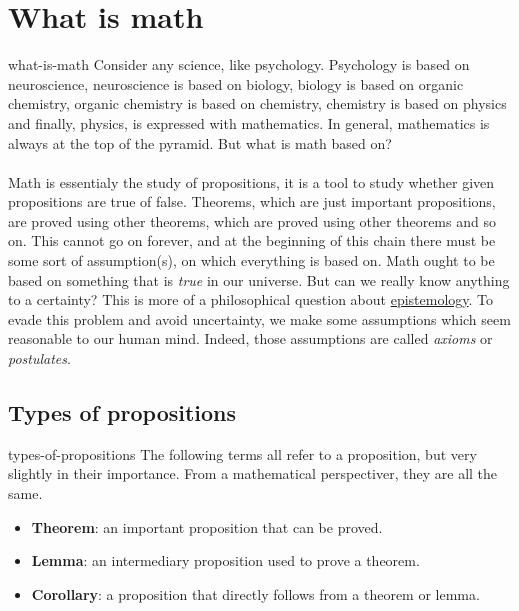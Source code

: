 \documentclass[preview]{standalone}
\begin{document}
\genpage

\section{What is math}

\begin{snippet}{what-is-math}
Consider any science, like psychology. Psychology is based on
neuroscience, neuroscience is based on biology,
biology is based on organic chemistry, organic chemistry is based on chemistry,
chemistry is based on physics and finally, physics, is expressed with mathematics.
In general, mathematics is always at the top of the pyramid.
But what is math based on?
\\\\
Math is essentialy the study of propositions,
it is a tool to study whether given propositions are true of false.
Theorems, which are just important propositions, are proved using other theorems,
which are proved using other theorems and so on. This cannot go on forever, and at the
beginning of this chain there must be some sort of assumption(s), on which everything
is based on.
Math ought to be based on something that is \textit{true} in our universe.
But can we really know anything to a certainty?
This is more of a philosophical question about \href{https://en.wikipedia.org/wiki/Epistemology}{epistemology}.
To evade this problem and avoid uncertainty, we make some assumptions which seem reasonable to our human mind.
Indeed, those assumptions are called \textit{axioms} or \textit{postulates}.
\end{snippet}


\subsection{Types of propositions}

\begin{snippet}{types-of-propositions}
The following terms all refer to a proposition, but very slightly in their importance.
From a mathematical perspectiver, they are all the same.
\\
\begin{itemize}
    \item \textbf{Theorem}: an important proposition that can be proved.
    \item \textbf{Lemma}: an intermediary proposition used to prove a theorem.
    \item \textbf{Corollary}: a proposition that directly follows from a theorem or lemma.
\end{itemize}
\end{snippet}
\end{document}
